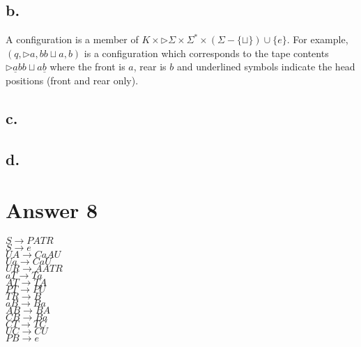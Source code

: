 \documentclass[12pt]{article}
\begin{document}
\subsection*{b.}
A configuration is a member of $K \times \triangleright \Sigma \times \Sigma^* \times  (\Sigma - \{\sqcup\})\cup \{e\}$. For example, $(q, \triangleright a, bb\sqcup a, b)$ is a configuration which corresponds to the tape contents $\triangleright \underline{a} bb\sqcup a\underline{b}$ where the front is $a$, rear is $b$ and underlined symbols indicate the head positions (front and rear only).
\subsection*{c.}

\subsection*{d.}

\section*{Answer 8}
$S\rightarrow PATR$\\
$S\rightarrow e$\\
$UA\rightarrow CaAU$\\
$Ua\rightarrow CaU$\\
$UR\rightarrow AATR$\\
$aT\rightarrow Ta$\\
$AT\rightarrow TA$\\
$PT\rightarrow PU$\\
$TR\rightarrow B$\\
$aB\rightarrow Ba$\\
$AB\rightarrow BA$\\
$CB\rightarrow Ba$\\
$CT\rightarrow TC$\\
$UC\rightarrow CU$\\
$PB\rightarrow e$\\
\end{document}

